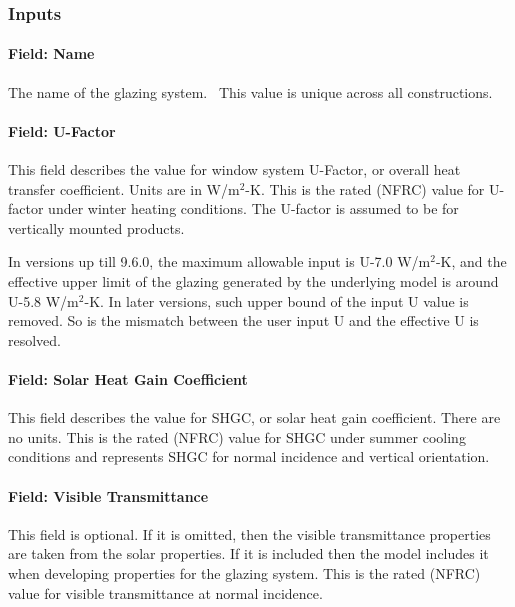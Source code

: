 \subsubsection{Inputs}\label{inputs-21-006}

\paragraph{Field: Name}\label{field-name-15-009}

The name of the glazing system.~ This value is unique across all constructions.

\paragraph{Field: U-Factor}\label{field-u-factor}

This field describes the value for window system U-Factor, or overall heat transfer coefficient. Units are in W/m$^{2}$-K. This is the rated (NFRC) value for U-factor under winter heating conditions. The U-factor is assumed to be for vertically mounted products.

In versions up till 9.6.0, the maximum allowable input is U-7.0 W/m$^{2}$-K, and the effective upper limit of the glazing generated by the underlying model is around U-5.8 W/m$^{2}$-K. In later versions, such upper bound of the input U value is removed. So is the mismatch between the user input U and the effective U is resolved.

\paragraph{Field: Solar Heat Gain Coefficient}\label{field-solar-heat-gain-coefficient}

This field describes the value for SHGC, or solar heat gain coefficient. There are no units. This is the rated (NFRC) value for SHGC under summer cooling conditions and represents SHGC for normal incidence and vertical orientation.

\paragraph{Field: Visible Transmittance}\label{field-visible-transmittance}

This field is optional. If it is omitted, then the visible transmittance properties are taken from the solar properties. If it is included then the model includes it when developing properties for the glazing system. This is the rated (NFRC) value for visible transmittance at normal incidence.

